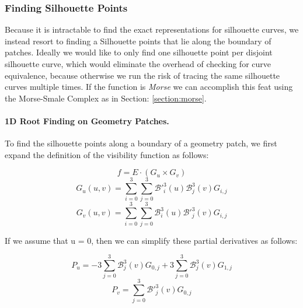 \documentclass[12pt, letterpaper]{article}
\begin{document}
		\subsubsection{Finding Silhouette Points}
			\label{section:findingSilhouettePoints}

			Because it is intractable to find the exact representations for silhouette curves, we instead resort to finding a Silhouette points that 
			lie along the boundary of patches. Ideally we would like to only find one silhouette point per disjoint silhouette curve,
			which would eliminate the overhead of checking for curve equivalence,
			because otherwise we run the risk of tracing the same silhouette curves multiple times.
			If the function is \emph{Morse} we can accomplish this feat using the Morse-Smale Complex as in Section: \ref{section:morse}.



		\paragraph{1D Root Finding on Geometry Patches.}
		\label{section:rootFindingGeometryPatch}

		To find the silhouette points along a boundary of a geometry patch, we first expand the definition of the visibility function as follows:

		$$ f = E \cdot (G_{u} \times G_{v}) $$
		$$ G_{u}(u, v) = \sum_{i=0}^{3} \sum_{j=0}^{3} \mathcal{B'}_{i}^{3}(u) \mathcal{B}_{j}^{3} (v) G_{i, j} $$
		$$ G_{v}(u, v) = \sum_{i=0}^{3} \sum_{j=0}^{3} \mathcal{B}_{i}^{3}(u)  \mathcal{B'}_{j}^{3} (v) G_{i, j} $$

		If we assume that u = 0, then we can simplify these partial derivatives as follows:

		\begin{equation} \label{eq:Pv0v}
		P_{u} = -3 \sum_{j=0}^{3} \mathcal{B}_{j}^{3}(v) G_{0, j} + 3 \sum_{j=0}^{3} \mathcal{B}_{j}^{3}(v) G_{1, j}
		\end{equation}
		\begin{equation} \label{eq:Pu0v}
		P_{v} = \sum_{j=0}^{3} \mathcal{B'}_{j}^{3} (v) G_{0, j}
		\end{equation}
\end{document}
